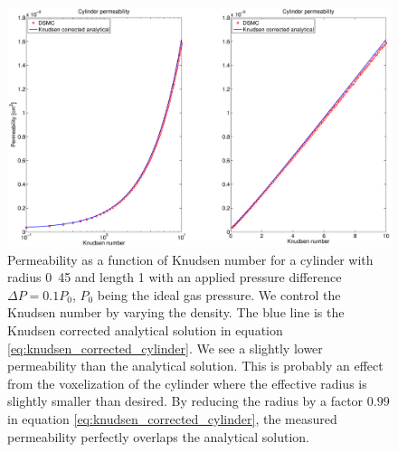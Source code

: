 \begin{figure}[h]
\begin{center}
\includegraphics[width=\textwidth, trim=0cm 0cm 0cm 0cm, clip]{DSMC/figures/cylinder_knudsen_permeability.eps}
\end{center}
\caption{Permeability as a function of Knudsen number for a cylinder with radius \unit{0.45}{\micro\meter} and length \unit{1}{\micro\meter} with an applied pressure difference $\Delta P = 0.1P_0$, $P_0$ being the ideal gas pressure. We control the Knudsen number by varying the density. The blue line is the Knudsen corrected analytical solution in equation \eqref{eq:knudsen_corrected_cylinder}. We see a slightly lower permeability than the analytical solution. This is probably an effect from the voxelization of the cylinder where the effective radius is slightly smaller than desired. By reducing the radius by a factor $0.99$ in equation \eqref{eq:knudsen_corrected_cylinder}, the measured permeability perfectly overlaps the analytical solution.}
\label{fig:one_cylinder_varying_knudsen}
\end{figure}

